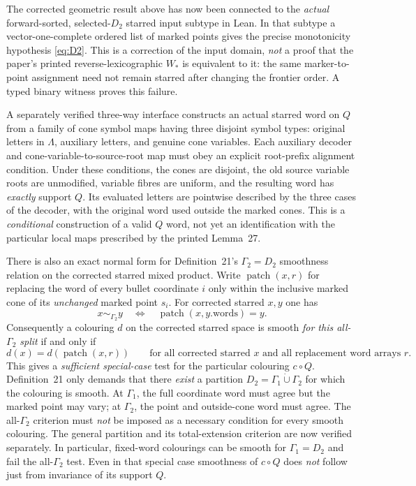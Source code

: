 \documentclass[11pt]{article}
\begin{document}
The corrected geometric result above has now been connected to
the \emph{actual} forward-sorted, selected-\(D_2\) starred
input subtype in Lean. In that subtype a vector-one-complete
ordered list of marked points gives the precise monotonicity
hypothesis \eqref{eq:D2}. This is a correction of the input
domain, \emph{not} a proof that the paper's printed
reverse-lexicographic \(W_*\) is equivalent to it:
the same marker-to-point assignment need not remain starred
after changing the frontier order. A typed binary witness
proves this failure.

A separately verified three-way interface constructs an
actual starred word on \(Q\) from a family of cone symbol maps
having three disjoint symbol types:
original letters in \(\Lambda\), auxiliary letters, and
genuine cone variables. Each auxiliary decoder and
cone-variable-to-source-root map must obey an explicit
root-prefix alignment condition. Under these conditions,
the cones are disjoint, the old source variable roots are
unmodified, variable fibres are uniform, and the resulting
word has \emph{exactly} support \(Q\).
Its evaluated letters are pointwise described by the three
cases of the decoder, with the original word used outside
the marked cones. This is a \emph{conditional} construction
of a valid \(Q\) word, not yet an identification with the
particular local maps prescribed by the printed Lemma~27.

There is also an exact normal form for
Definition~21's \(\Gamma_2=D_2\) smoothness relation on the
corrected starred mixed product. Write
\(\operatorname{patch}(x,r)\) for replacing the word of
every bullet coordinate \(i\) only within the inclusive
marked cone of its \emph{unchanged} marked point \(s_i\).
For corrected starred \(x,y\) one has
\[
 x\sim_{\Gamma_2}y
 \quad\Longleftrightarrow\quad
 \operatorname{patch}(x,y.\mathrm{words})=y.
\]
Consequently a colouring \(d\) on the corrected starred
space is smooth \emph{for this all-\(\Gamma_2\) split}
if and only if
\[
 d(x)=d(\operatorname{patch}(x,r))
 \qquad\text{for all corrected starred }x
 \text{ and all replacement word arrays }r.
\]
This gives a \emph{sufficient special-case} test for
the particular colouring \(c\circ Q\).
Definition~21 only demands that there \emph{exist}
a partition \(D_2=\Gamma_1\dot\cup\Gamma_2\)
for which the colouring is smooth.
At \(\Gamma_1\), the full coordinate word must
agree but the marked point may vary; at
\(\Gamma_2\), the point and outside-cone
word must agree. The all-\(\Gamma_2\)
criterion must \emph{not} be imposed as a necessary
condition for every smooth colouring.
The general partition and its total-extension
criterion are now verified separately.
In particular, fixed-word colourings can be smooth
for \(\Gamma_1=D_2\) and fail the all-\(\Gamma_2\) test.
Even in that special case smoothness of \(c\circ Q\)
does \emph{not} follow just from invariance of
its support \(Q\).
\end{document}
